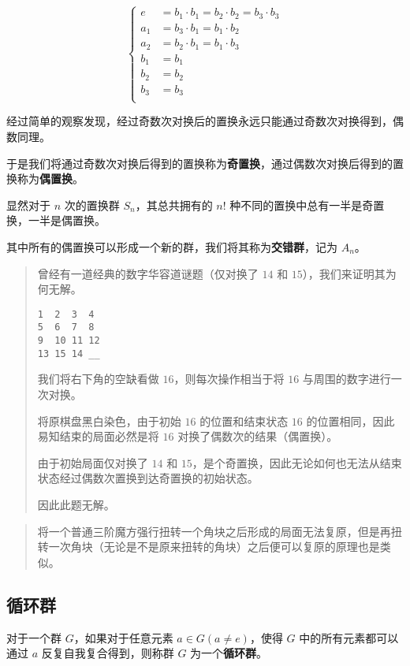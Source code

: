 \documentclass[hyperref,UTF8,12pt,a4paper]{ctexart}
\begin{document}
$$
\begin{cases}
e&=b_1 \cdot b_1 = b_2 \cdot b_2 = b_3 \cdot b_3 \\
a_1&=b_3 \cdot b_1 = b_1 \cdot b_2 \\
a_2&=b_2 \cdot b_1 = b_1 \cdot b_3 \\
b_1&=b_1 \\
b_2&=b_2 \\
b_3&=b_3 \\
\end{cases}
$$

经过简单的观察发现，经过奇数次对换后的置换永远只能通过奇数次对换得到，偶数同理。

于是我们将通过奇数次对换后得到的置换称为\textbf{奇置换}，通过偶数次对换后得到的置换称为\textbf{偶置换}。

显然对于 $n$ 次的置换群 $S_n$，其总共拥有的 $n!$ 种不同的置换中总有一半是奇置换，一半是偶置换。

其中所有的偶置换可以形成一个新的群，我们将其称为\textbf{交错群}，记为 $A_n$。

\begin{quote}
曾经有一道经典的数字华容道谜题（仅对换了 $14$ 和 $15$），我们来证明其为何无解。

\begin{verbatim}
1  2  3  4
5  6  7  8
9  10 11 12
13 15 14 __
\end{verbatim}

我们将右下角的空缺看做 $16$，则每次操作相当于将 $16$ 与周围的数字进行一次对换。

将原棋盘黑白染色，由于初始 $16$ 的位置和结束状态 $16$ 的位置相同，因此易知结束的局面必然是将 $16$ 对换了偶数次的结果（偶置换）。

由于初始局面仅对换了 $14$ 和 $15$，是个奇置换，因此无论如何也无法从结束状态经过偶数次置换到达奇置换的初始状态。

因此此题无解。
\end{quote}

\begin{quote}
将一个普通三阶魔方强行扭转一个角块之后形成的局面无法复原，但是再扭转一次角块（无论是不是原来扭转的角块）之后便可以复原的原理也是类似。
\end{quote}

\subsection{循环群}

对于一个群 $G$，如果对于任意元素 $a \in G(a \ne e)$，使得 $G$ 中的所有元素都可以通过 $a$ 反复自我复合得到，则称群 $G$ 为一个\textbf{循环群}。
\end{document}
